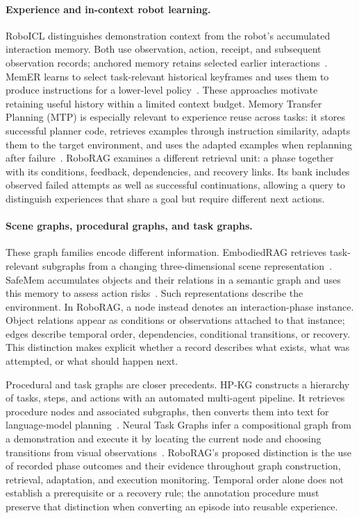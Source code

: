 \documentclass[10pt,twocolumn,letterpaper]{article}
\begin{document}
\paragraph{Experience and in-context robot learning.}
RoboICL distinguishes demonstration context from the robot's accumulated interaction memory. Both use observation, action, receipt, and subsequent observation records; anchored memory retains selected earlier interactions~\cite{roboicl2026}. MemER learns to select task-relevant historical keyframes and uses them to produce instructions for a lower-level policy~\cite{memer2026}. These approaches motivate retaining useful history within a limited context budget. Memory Transfer Planning (MTP) is especially relevant to experience reuse across tasks: it stores successful planner code, retrieves examples through instruction similarity, adapts them to the target environment, and uses the adapted examples when replanning after failure~\cite{mtp2025}. RoboRAG examines a different retrieval unit: a phase together with its conditions, feedback, dependencies, and recovery links. Its bank includes observed failed attempts as well as successful continuations, allowing a query to distinguish experiences that share a goal but require different next actions.

\paragraph{Scene graphs, procedural graphs, and task graphs.}
These graph families encode different information. EmbodiedRAG retrieves task-relevant subgraphs from a changing three-dimensional scene representation~\cite{embodiedrag2024}. SafeMem accumulates objects and their relations in a semantic graph and uses this memory to assess action risks~\cite{safemem2026}. Such representations describe the environment. In RoboRAG, a node instead denotes an interaction-phase instance. Object relations appear as conditions or observations attached to that instance; edges describe temporal order, dependencies, conditional transitions, or recovery. This distinction makes explicit whether a record describes what exists, what was attempted, or what should happen next.

Procedural and task graphs are closer precedents. HP-KG constructs a hierarchy of tasks, steps, and actions with an automated multi-agent pipeline. It retrieves procedure nodes and associated subgraphs, then converts them into text for language-model planning~\cite{hpkg2025}. Neural Task Graphs infer a compositional graph from a demonstration and execute it by locating the current node and choosing transitions from visual observations~\cite{ntg2019}. RoboRAG's proposed distinction is the use of recorded phase outcomes and their evidence throughout graph construction, retrieval, adaptation, and execution monitoring. Temporal order alone does not establish a prerequisite or a recovery rule; the annotation procedure must preserve that distinction when converting an episode into reusable experience.
\end{document}
